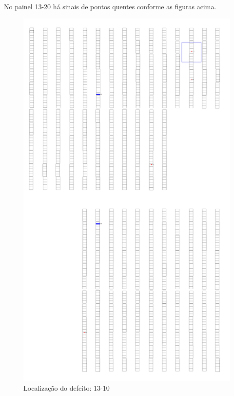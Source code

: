 \documentclass[dvipsnames]{article}%
\begin{document}
%
\FloatBarrier%
No painel 13{-}20 há sinais de pontos quentes conforme as figuras acima.\newline%
%


\begin{figure}[h!]%
\begin{minipage}{0.31\linewidth}%
\centering%
\centering%
\includegraphics[width=\linewidth]{report_images/hotspots_13-10_map.jpg}%
\caption{Localização do defeito: 13-10}%
\end{minipage}%
\hfill%
\begin{minipage}{0.31\linewidth}%

\end{minipage}
\end{figure}
\end{document}

